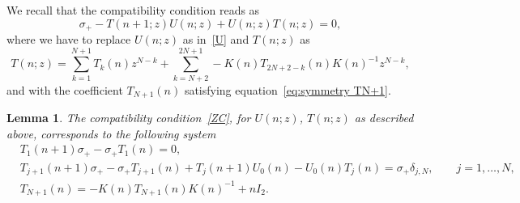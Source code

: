 \documentclass[pdftex]{sigma}%
\numberwithin{equation}{section}
\newtheorem{Lemma}[Theorem]{Lemma}
\begin{document}
	We recall that the compatibility condition reads as
	\begin{equation}
		\label{ZC}
		\sigma_+-T(n+1;z)U(n;z)+U(n;z)T(n;z)=0,
	\end{equation}
	where we have to replace $U(n;z)$ as in~\eqref{U} and $T(n;z)$ as
	\begin{equation}\label{eq: Tsymmetricform}
		T(n;z) =\sum_{k=1}^{N+1} T_k(n)z^{N-k}+
		\sum_{k=N+2}^{2N+1}-K(n)T_{2N+2-k}(n)K(n)^{-1}z^{N-k},
	\end{equation}
	and with the coefficient $T_{N+1}(n)$ satisfying equation~\eqref{eq:symmetry TN+1}.
	
\begin{Lemma}
The compatibility condition~\eqref{ZC}, for $U(n;z)$, $T(n;z)$ as described above, corresponds to the following system
\begin{align*}
& T_1(n+1)\sigma_+-\sigma_+T_1(n)=0, \\
&T_{j+1}(n+1)\sigma_+-\sigma_+T_{j+1}(n)+T_{j}(n+1)U_0(n)-U_0(n)T_{j}(n)= \sigma_+\delta_{j,N}, \qquad j=1,\dots,N,\\
&T_{N+1}(n) =-K(n)T_{N+1}(n)K(n)^{-1}+nI_2.
\end{align*}
\end{Lemma}
\end{document}
